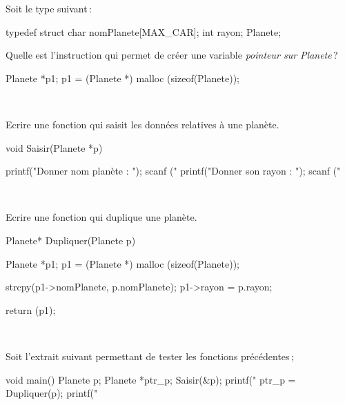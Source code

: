 \documentclass[10pt]{article}\usepackage[nu]{esial}
\begin{document}
\bigskip\bigskip{}

Soit le type suivant\,:


\medskip

\begin{boxedverbatim}
  typedef struct {
    char nomPlanete[MAX_CAR];
    int  rayon;  
  } Planete;
\end{boxedverbatim}


\Question Quelle est l'instruction qui permet de créer une variable
{\em pointeur sur Planete}\,?

\begin{Reponse}
  \begin{boxedverbatim} 
    Planete *p1;
    p1 = (Planete *) malloc (sizeof(Planete));
  \end{boxedverbatim}
~
\end{Reponse}
	  
\Question Ecrire une fonction qui saisit les données relatives à une
planète.

\begin{Reponse}
  \begin{boxedverbatim} 
    void Saisir(Planete *p){
  
      printf("Donner nom planète : ");
      scanf ("%
      printf("Donner son rayon : ");
      scanf ("%
    } 
  \end{boxedverbatim}
~
\end{Reponse}

\Question Ecrire une fonction qui duplique une planète. 

\begin{Reponse}
  \begin{boxedverbatim} 
    Planete* Dupliquer(Planete p){
  
      Planete *p1;
      p1 = (Planete *) malloc (sizeof(Planete));
      
      strcpy(p1->nomPlanete, p.nomPlanete);
      p1->rayon = p.rayon;
      
      return (p1);
    }
    
  \end{boxedverbatim}
~
\end{Reponse}

\Question  Soit l'extrait suivant permettant de tester les fonctions
précédentes\,;


\medskip


\begin{boxedverbatim}
void main()
{
  Planete p;
  Planete *ptr_p;
  Saisir(&p);
  printf("%
  ptr_p = Dupliquer(p);
  printf("%
}
\end{boxedverbatim}
\end{document}
